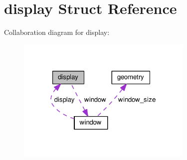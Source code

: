 \hypertarget{structdisplay}{\section{display Struct Reference}
\label{structdisplay}
}


Collaboration diagram for display\-:
\nopagebreak
\begin{figure}[H]
\begin{center}
\leavevmode
\includegraphics[width=239pt]{structdisplay__coll__graph}
\end{center}
\end{figure}
